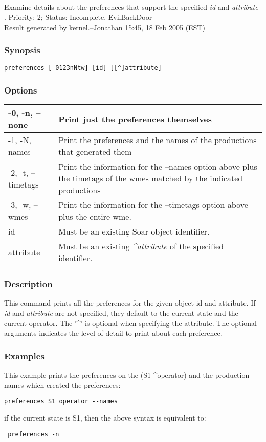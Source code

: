\subsection{}
\label{preferences}
Examine details about the preferences that support the specified \emph{id}
 and \emph{attribute}
. 
 Priority: 2; Status: Incomplete, EvilBackDoor\\ 
Result generated by kernel.--Jonathan 15:45, 18 Feb 2005 (EST) 
\subsubsection*{Synopsis}
\begin{verbatim}
preferences [-0123nNtw] [id] [[^]attribute]
\end{verbatim}
\subsubsection*{Options}
\begin{tabular}{|l|l|}
\hline 
 -0, -n, --none  & Print just the preferences themselves  \\
 \hline 
 -1, -N, --names  & Print the preferences and the names of the productions that generated them  \\
 \hline 
 -2, -t, --timetags  & Print the information for the --names option above plus the timetags of the wmes matched by the indicated productions  \\
 \hline 
 -3, -w, --wmes  & Print the information for the --timetags option above plus the entire wme.  \\
 \hline 
id & Must be an existing Soar object identifier.  \\
 \hline 
attribute & Must be an existing \emph{\^{}attribute}
 of the specified identifier.  \\
 \hline 
\end{tabular}
\subsubsection*{Description}
 This command prints all the preferences for the given object id and attribute. If \emph{id}
 and \emph{attribute}
 are not specified, they default to the current state and the current operator. The '\^{}' is optional when specifying the attribute. The optional arguments indicates the level of detail to print about each preference. 
\subsubsection*{Examples}
 This example prints the preferences on the (S1 \^{}operator) and the production names which created the preferences: \begin{verbatim}
preferences S1 operator --names
\end{verbatim}
 if the current state is S1, then the above syntax is equivalent to: \begin{verbatim}
 preferences -n
\end{verbatim}
